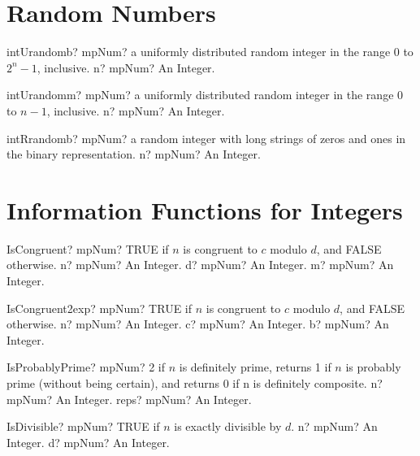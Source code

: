 \documentclass[12pt,a4paper,openany]{book}
\begin{document}
\section{Random Numbers}

\begin{mpFunctionsExtract}
\mpFunctionOne
{intUrandomb? mpNum? a uniformly distributed random integer in the range 0 to $2^n - 1$, inclusive.}
{n? mpNum? An Integer.}
\end{mpFunctionsExtract}

\begin{mpFunctionsExtract}
\mpFunctionOne
{intUrandomm? mpNum? a uniformly distributed random integer in the range 0 to $n - 1$, inclusive.}
{n? mpNum? An Integer.}
\end{mpFunctionsExtract}

\begin{mpFunctionsExtract}
\mpFunctionOne
{intRrandomb? mpNum? a random integer with long strings of zeros and ones in the binary representation.}
{n? mpNum? An Integer.}
\end{mpFunctionsExtract}

\section{Information Functions for Integers}

\begin{mpFunctionsExtract}
\mpFunctionThree
{IsCongruent? mpNum? TRUE if $n$ is congruent to $c$ modulo $d$, and FALSE otherwise.}
{n? mpNum? An Integer.}
{d? mpNum? An Integer.}
{m? mpNum? An Integer.}
\end{mpFunctionsExtract}

\begin{mpFunctionsExtract}
\mpFunctionThree
{IsCongruent2exp? mpNum? TRUE if $n$ is congruent to $c$ modulo $d$, and FALSE otherwise.}
{n? mpNum? An Integer.}
{c? mpNum? An Integer.}
{b? mpNum? An Integer.}
\end{mpFunctionsExtract}

\begin{mpFunctionsExtract}
\mpFunctionTwo
{IsProbablyPrime? mpNum? 2 if $n$ is definitely prime, returns 1 if $n$ is probably prime (without being certain), and returns 0 if n is definitely composite.}
{n? mpNum? An Integer.}
{reps? mpNum? An Integer.}
\end{mpFunctionsExtract}

\begin{mpFunctionsExtract}
\mpFunctionTwo
{IsDivisible? mpNum? TRUE if $n$ is exactly divisible by $d$.}
{n? mpNum? An Integer.}
{d? mpNum? An Integer.}
\end{mpFunctionsExtract}
\end{document}
